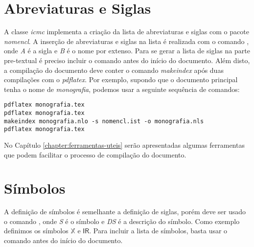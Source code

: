 \section{Abreviaturas e Siglas}

A classe \textit{icmc} implementa a criação da lista de abreviaturas e siglas com o pacote \textit{nomencl}. A inserção de abreviaturas e siglas na lista é realizada com o comando , onde \textit{A} é a sigla e \textit{B} é o nome por extenso. Para se gerar a lista de siglas na parte pre-textual é preciso incluir o comando  antes do início do documento. Além disto, a compilação do documento deve conter o comando \textit{makeindex} após duas compilações com o \textit{pdflatex}. Por exemplo, supondo que o documento principal tenha o nome de \textit{monografia}, podemos usar a seguinte sequência de comandos:
\begin{verbatim}
pdflatex monografia.tex
pdflatex monografia.tex
makeindex monografia.nlo -s nomencl.ist -o monografia.nls
pdflatex monografia.tex
\end{verbatim}

No Capítulo \ref{chapter:ferramentas-uteis} serão apresentadas algumas ferramentas que podem facilitar o processo de compilação do documento.

\section{Símbolos}

A definição de símbolos é semelhante a definição de siglas, porém deve ser usado o comando , onde \textit{S} é o símbolo e \textit{DS} é a descrição do símbolo. Como exemplo definimos os símbolos $\mathbb{X}$ e $\mathsf{I\!R}$. Para incluir a lista de símbolos, basta usar o comando  antes do início do documento.
